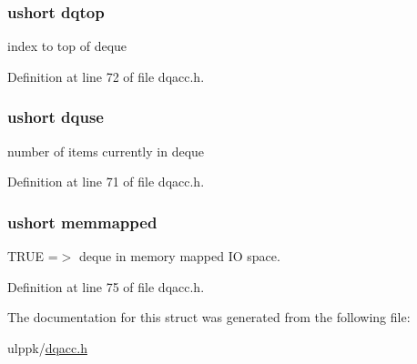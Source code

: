 \hypertarget{struct_d_q_h_e_a_d_e_r_ad2adafc57e3081492ed903ae8970f9de}{
\subsubsection[{dqtop}]{\setlength{\rightskip}{0pt plus 5cm}ushort dqtop}}\label{struct_d_q_h_e_a_d_e_r_ad2adafc57e3081492ed903ae8970f9de}


index to top of deque 



Definition at line 72 of file dqacc.\-h.

\hypertarget{struct_d_q_h_e_a_d_e_r_a2fdb1d169ae74820026e2897a3dec9a3}{
\subsubsection[{dquse}]{\setlength{\rightskip}{0pt plus 5cm}ushort dquse}}\label{struct_d_q_h_e_a_d_e_r_a2fdb1d169ae74820026e2897a3dec9a3}


number of items currently in deque 



Definition at line 71 of file dqacc.\-h.

\hypertarget{struct_d_q_h_e_a_d_e_r_a738331e6f1d54405b568a4c032f8c8eb}{
\subsubsection[{memmapped}]{\setlength{\rightskip}{0pt plus 5cm}ushort memmapped}}\label{struct_d_q_h_e_a_d_e_r_a738331e6f1d54405b568a4c032f8c8eb}


T\-R\-U\-E =$>$ deque in memory mapped I\-O space. 



Definition at line 75 of file dqacc.\-h.



The documentation for this struct was generated from the following file\-:\begin{DoxyCompactItemize}
\item 
ulppk/\hyperlink{dqacc_8h}{dqacc.\-h}\end{DoxyCompactItemize}
